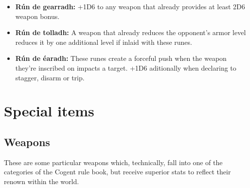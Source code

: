 \documentclass[parskip=full,11pt,%
footheight=38pt]{scrreport}
\begin{document}
\begin{itemize}
	\item \textbf{Rún de gearradh:} +1D6 to any weapon that already provides at least 2D6 weapon bonus.
	\item \textbf{Rún de tolladh:} A weapon that already reduces the opponent's armor level reduces it
	      by one additional level if inlaid with these runes.
	\item \textbf{Rún de éaradh:} These runes create a forceful push when the weapon they're inscribed
	      on impacts a target. +1D6 aditionally when declaring to stagger, disarm or trip.
\end{itemize}

\chapter{Special items}
\section{Weapons}
These are some particular weapons which, technically, fall into one of the categories of the Cogent rule book,
but receive superior stats to reflect their renown within the world.

\end{document}
